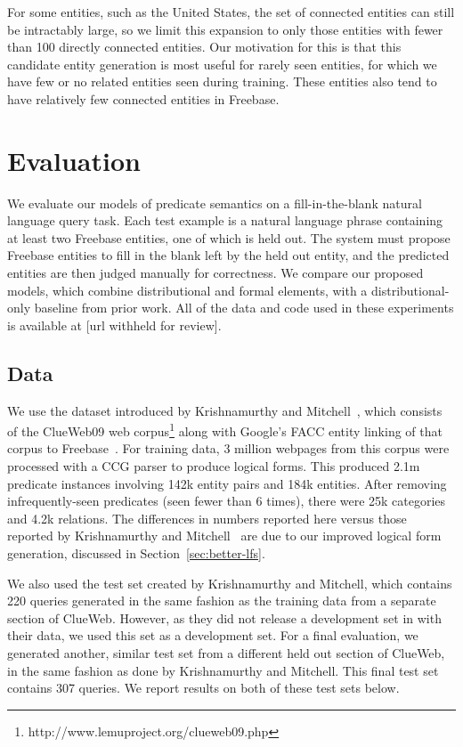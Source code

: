 \documentclass[11pt]{article}
\newcommand{\secref}[1]{Section~\ref{sec:#1}}
\begin{document}
For some entities, such as the United States, the set of connected entities can
still be intractably large, so we limit this expansion to only those entities
with fewer than 100 directly connected entities.  Our motivation for this is
that this candidate entity generation is most useful for rarely seen entities,
for which we have few or no related entities seen during training.  These
entities also tend to have relatively few connected entities in Freebase.

\section{Evaluation}
\label{sec:evaluation}

We evaluate our models of predicate semantics on a fill-in-the-blank
natural language query task.  Each test example is a natural language
phrase containing at least two Freebase entities, one of which is held
out.  The system must propose Freebase entities to fill in the blank
left by the held out entity, and the predicted entities are then
judged manually for correctness.  We compare our proposed models,
which combine distributional and formal elements, with a
distributional-only baseline from prior work.  All of the data and
code used in these experiments is available at [url withheld for
review].

\subsection{Data}

We use the dataset introduced by Krishnamurthy and
Mitchell~,
which consists of the ClueWeb09 web
corpus\footnote{http://www.lemuproject.org/clueweb09.php} along with
Google's FACC entity linking of that corpus to
Freebase~\cite{gabrilovich-2013-clueweb-entity-linking}.  For training
data, 3 million webpages from this corpus were processed with a CCG
parser to produce logical forms.  This produced 2.1m predicate
instances involving 142k entity pairs and 184k entities.  After
removing infrequently-seen predicates (seen fewer than 6 times), there
were 25k categories and 4.2k relations.  The differences in numbers
reported here versus those reported by Krishnamurthy and
Mitchell~ are
due to our improved logical form generation, discussed in
\secref{better-lfs}.

We also used the test set created by Krishnamurthy and Mitchell, which
contains 220 queries generated in the same fashion as the training
data from a separate section of ClueWeb.  However, as they did not
release a development set in with their data, we used this set as a
development set.  For a final evaluation, we generated another,
similar test set from a different held out section of ClueWeb, in the
same fashion as done by Krishnamurthy and Mitchell.  This final test
set contains 307 queries.  We report results on both of these test
sets below.
\end{document}

